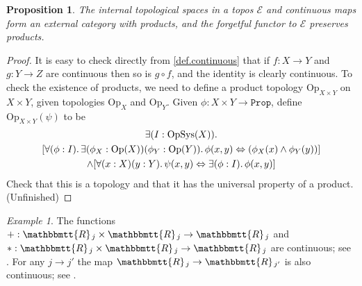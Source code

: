 \documentclass[11pt, oneside, article]{memoir}
\theoremstyle{plain}
\newtheorem{proposition}[theorem]{Proposition}
\theoremstyle{definition}
\newtheorem{definition}[theorem]{Definition}
\theoremstyle{remark}
\newtheorem{example}[theorem]{Example}
\newcommand{\const}[1]{\mathtt{#1}}
\newcommand{\Set}[1]{\mathrm{#1}}
\newcommand{\cat}[1]{\mathcal{#1}}
\newcommand{\Fun}[1]{\mathsf{#1}}
\newcommand{\internal}[1]{\raisebox{-.03ex}{$\mathbbmtt{#1}$}}
\newcommand{\hs}{\hspace{1.1pt}}
\newcommand{\tRR}{\internal{R}\hs}
\newcommand{\tRRat}[1]{\tRR_{\SeeInline{#1}}}
\newcommand{\Cont}{\Fun{Cont}}
\newcommand{\Prop}{\const{Prop}}
\newcommand{\Op}{\Set{Op}}
\newcommand{\SeeSymbol}{{\down}}  %
\newcommand{\See}[2][]{\SeeSymbol^{#1}_{#2}}
\newcommand{\SeeInline}[1]{\SeeSymbol{#1}}
\newcommand{\down}{\mathord{\downarrow}}
\renewcommand{\iff}{\Leftrightarrow}
\begin{document}
\begin{proposition}
The internal topological spaces in a topos $\cat{E}$ and continuous maps form an external category with products, and the forgetful functor to $\cat{E}$ preserves products.
\end{proposition}
\begin{proof}
It is easy to check directly from \cref{def.continuous} that if $f:X\to Y$ and $g:Y\to Z$ are continuous then so is $g\circ f$, and the identity is clearly continuous. To check the existence of products, we need to define a product topology $\Op_{X\times Y}$ on $X\times Y$, given topologies $\Op_X$ and $\Op_Y$. Given $\phi:X\times Y\to\Prop$, define $\Op_{X\times Y}(\psi)$ to be
\begin{multline*}
	\exists(I:\mathrm{OpSys}(X))\ldotp\\
	[\forall(\phi:I)\ldotp\exists(\phi_X:\Op(X))(\phi_Y:\Op(Y))\ldotp\phi(x,y)\iff(\phi_X(x)\wedge\phi_Y(y))]\\\wedge[\forall(x:X)(y:Y)\ldotp\psi(x,y)\iff\exists(\phi:I)\ldotp\phi(x,y)]
\end{multline*}
Check that this is a topology and that it has the universal property of a product. (Unfinished)
\end{proof}

\begin{example}
The functions $+:\tRR_j\times\tRR_j\to\tRR_j$ and $*:\tRR_j\times\tRR_j\to\tRR_j$ are continuous; see \cite[Theorems 4.44, 4.48]{Schultz.Spivak:2017a}. For any $j\to j'$ the map $\tRR_j\to\tRR_{j'}$ is also continuous; see \cite[Proposition 4.52]{Schultz.Spivak:2017a}.
\end{example}

\end{document}
